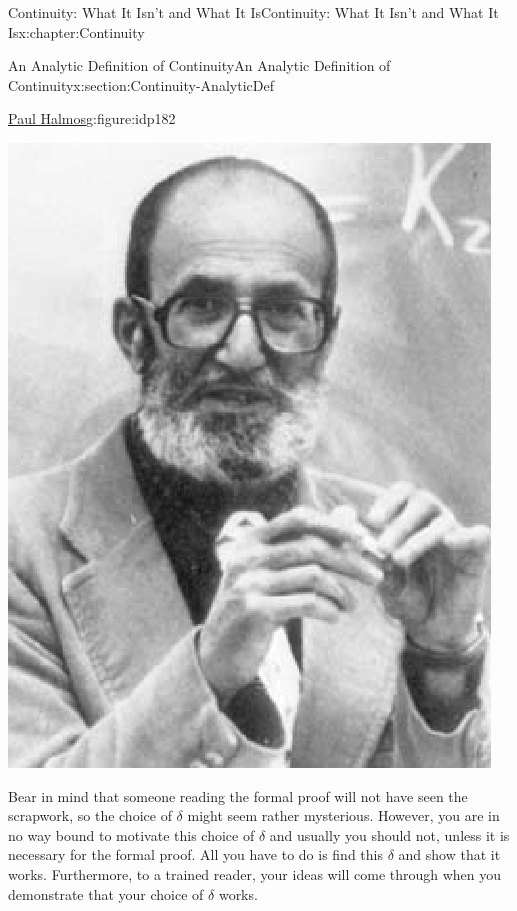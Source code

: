 \begin{chapterptx}{Continuity: What It Isn't and What It Is}{}{Continuity: What It Isn't and What It Is}{}{}{x:chapter:Continuity}
\begin{sectionptx}{An Analytic Definition of Continuity}{}{An Analytic Definition of Continuity}{}{}{x:section:Continuity-AnalyticDef}
\begin{figureptx}{\href{https://mathshistory.st-andrews.ac.uk/Biographies/Halmos/}{Paul Halmos}\protect\footnotemark{}}{g:figure:idp182}{}
\begin{image}{0.325}{0.35}{0.325}
				\includegraphics[width=\linewidth]{external/images/Halmos.png}
			\end{image}%
			\tcblower
		\end{figureptx}%
		Bear in mind that someone reading the formal proof will not have seen the scrapwork, so the choice of \(\delta\) might seem rather mysterious.  However, you are in no way bound to motivate this choice of \(\delta\) and usually you should not, unless it is necessary for the formal proof.  All you have to do is find this \(\delta\) and show that it works.  Furthermore, to a trained reader, your ideas will come through when you demonstrate that your choice of \(\delta\) works.%
		\par

\end{sectionptx}
\end{chapterptx}
